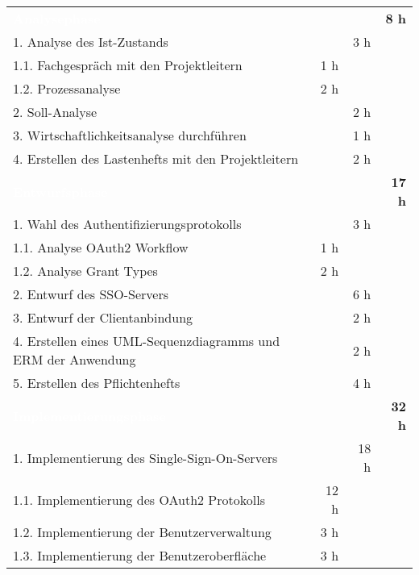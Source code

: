 \begin{tabularx}{\textwidth}{Xrrr}

\rowcolor{heading}\textbf{\textcolor{white}{Analysephase}} & \textbf{} & \textbf{} & \textbf{8 h} \\
1. Analyse des Ist-Zustands &       & 3 h   &  \\
\rowcolor{odd}1.1. Fachgespräch mit den Projektleitern & 1 h   &       &  \\
1.2. Prozessanalyse  & 2 h   &       &  \\

\rowcolor{odd}2. Soll-Analyse  &    &   2 h    &  \\

3. Wirtschaftlichkeitsanalyse durchführen &       & 1 h   &  \\

\rowcolor{odd}4. Erstellen des Lastenhefts mit den Projektleitern &       & 2 h   &  \\


\rowcolor{heading}\textbf{\textcolor{white}{Entwurfsphase}} & \textbf{} & \textbf{} & \textbf{17 h} \\
1. Wahl des Authentifizierungsprotokolls &       & 3 h   &  \\
\rowcolor{odd}1.1. Analyse OAuth2 Workflow  & 1 h & & \\
1.2. Analyse Grant Types	&	2 h & 	& \\

\rowcolor{odd}2. Entwurf des SSO-Servers &       & 6 h   &  \\

3. Entwurf der Clientanbindung &       & 2 h   &  \\

\rowcolor{odd}4. Erstellen eines UML-Sequenzdiagramms und ERM der Anwendung &       & 2 h   &  \\

5. Erstellen des Pflichtenhefts &       & 4 h   &  \\


\rowcolor{heading}\textbf{\textcolor{white}{Implementierungsphase}} & \textbf{} & \textbf{} & \textbf{32 h} \\
1. Implementierung des Single-Sign-On-Servers	&		&		18 h		& \\
\rowcolor{odd}1.1. Implementierung des OAuth2 Protokolls & 12 h   &       &  \\
1.2. Implementierung der Benutzerverwaltung & 3 h   &       &  \\
\rowcolor{odd}1.3. Implementierung der Benutzeroberfläche & 3 h   &       &  \\


\end{tabularx}
